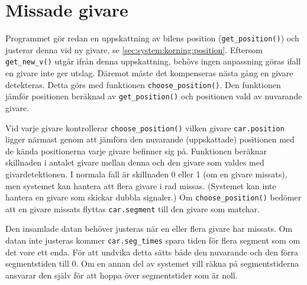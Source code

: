 \section{Missade givare}
\label{sec:missade givare}

Programmet gör redan en uppskattning av bilens position (\texttt{get\_position()})
 och justerar denna vid ny givare, se \ref{sec:system:korning:position}.
Eftersom \texttt{get\_new\_v()} utgår ifrån denna uppskattning, behövs ingen
anpassning göras ifall en givare inte ger utslag. Däremot måste det 
kompenseras nästa gång en givare detekteras. Detta görs med funktionen
\texttt{choose\_position()}. Den funktionen jämför positionen beräknad av 
\texttt{get\_position()} och positionen vald av nuvarande givare. 

Vid varje givare kontrollerar \texttt{choose\_position()} vilken givare
\texttt{car.position} ligger närmast genom att jämföra den nuvarande
(uppskattade) positionen med de kända positionerna varje givare befinner sig på.
Funktionen beräknar skillnaden i antalet givare mellan denna och den givare som
valdes med givardetektionen. I normala fall är skillnaden 0 eller 1 (om en
givare missats), men systemet kan hantera att flera givare i rad missas.
(Systemet kan inte hantera en givare som skickar dubbla signaler.) Om
\texttt{choose\_position()} bedömer att en givare missats flyttas
\texttt{car.segment} till den givare som matchar.

Den insamlade datan behöver justeras när en eller flera givare har missats. Om
datan inte justeras kommer \texttt{car.seg\_times} spara tiden för flera segment
som om det vore ett enda. För att undvika detta sätts både den nuvarande och den
förra segmentstiden till 0. Om en annan del av systemet vill räkna på
segmentstiderna ansvarar den själv för att hoppa över segmentstider som är noll.
